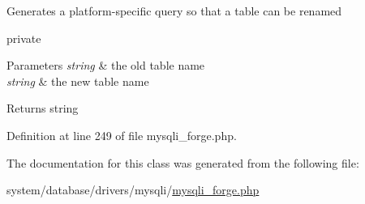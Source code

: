 Generates a platform-\/specific query so that a table can be renamed

private 
\begin{DoxyParams}{Parameters}
{\em string} & the old table name \\
\hline
{\em string} & the new table name \\
\hline
\end{DoxyParams}
\begin{DoxyReturn}{Returns}
string 
\end{DoxyReturn}


Definition at line 249 of file mysqli\-\_\-forge.\-php.



The documentation for this class was generated from the following file\-:\begin{DoxyCompactItemize}
\item 
system/database/drivers/mysqli/\hyperlink{mysqli__forge_8php}{mysqli\-\_\-forge.\-php}\end{DoxyCompactItemize}
